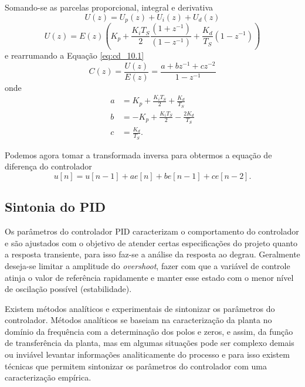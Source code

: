 Somando-se as parcelas proporcional, integral e derivativa
\begin{equation}
    \label{eq:cd_10}
    U(z) = U_p(z) + U_i(z) + U_d(z)
\end{equation}
\begin{equation}
    \label{eq:cd_10.1}
    U(z) = E(z)\left(K_p+\frac{K_iT_S}{2} \frac{(1+z^{-1})}{(1-z^{-1})} + \frac{K_d}{T_S}(1-z^{-1})\right)
\end{equation}
e rearrumando a Equação \eqref{eq:cd_10.1}
\begin{equation}
    \label{eq:cd_11}
    C(z) = \frac{U(z)}{E(z)} = \frac{a+bz^{-1}+cz^{-2}}{1-z^{-1}}
\end{equation}
onde
\begin{align}
  a &= K_p + \frac{K_iT_S}{2} + \frac{K_d}{T_S} \nonumber\\
  b &= -K_p + \frac{K_iT_S}{2} - \frac{2K_d}{T_S} \nonumber\\
  c &= \frac{K_d}{T_S}. \nonumber
\end{align}

Podemos agora tomar a transformada inversa para obtermos a equação de diferença do controlador
\begin{equation}
    \label{eq:cd_12}
    u[n] = u[n-1] + ae[n] + be[n-1]+ce[n-2].
\end{equation}

\subsection{Sintonia do PID}

Os parâmetros do controlador PID caracterizam o comportamento do controlador e são ajustados com o objetivo de atender certas especificações do projeto quanto a resposta transiente, para isso faz-se a análise da resposta ao degrau. Geralmente deseja-se limitar a amplitude do \textit{overshoot}, fazer com que a variável de controle atinja o valor de referência rapidamente e manter esse estado com o menor nível de oscilação possível (estabilidade). 

Existem métodos analíticos e experimentais de sintonizar os parâmetros do controlador. Métodos analíticos se baseiam na caracterização da planta no domínio da frequência com a determinação dos polos e zeros, e assim, da função de transferência da planta, mas em algumas situações pode ser complexo demais ou inviável levantar informações analiticamente do processo e para isso existem técnicas que permitem sintonizar os parâmetros do controlador com uma caracterização empírica.


